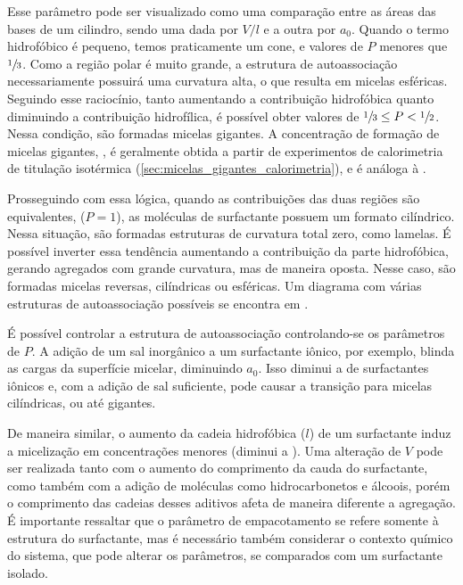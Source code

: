	Esse parâmetro pode ser visualizado como uma comparação entre as áreas das bases de um cilindro, sendo uma dada por \({V}/{l}\) e a outra por \(a_0\). Quando o termo hidrofóbico é pequeno, temos praticamente um cone, e valores de \(P\) menores que \(\sfrac{1}{3}\). Como a região polar é muito grande, a estrutura de autoassociação necessariamente possuirá uma curvatura alta, o que resulta em micelas esféricas. Seguindo esse raciocínio, tanto aumentando a contribuição hidrofóbica quanto diminuindo a contribuição hidrofílica, é possível obter valores de \(\sfrac{1}{3} \leq P < \sfrac{1}{2}\). Nessa condição, são formadas micelas gigantes. A concentração de formação de micelas gigantes, \cwlm, é geralmente obtida a partir de experimentos de calorimetria de titulação isotérmica (\autoref{sec:micelas_gigantes_calorimetria}), e é análoga à \cmc.
	
	Prosseguindo com essa lógica, quando as contribuições das duas regiões são equivalentes, (\(P = 1\)), as moléculas de surfactante possuem um formato cilíndrico. Nessa situação, são formadas estruturas de curvatura total zero, como lamelas.\cite{Zou2007} É possível inverter essa tendência aumentando a contribuição da parte hidrofóbica, gerando agregados com grande curvatura, mas de maneira oposta. Nesse caso, são formadas micelas reversas, cilíndricas\cite{Tung2006} ou esféricas\cite{Mackeben2001a}.  Um diagrama com várias estruturas de autoassociação possíveis se encontra em \citeauthor{Lindman_livro}.

	É possível controlar a estrutura de autoassociação controlando-se os parâmetros de \(P\). A adição de um sal inorgânico a um surfactante iônico, por exemplo, blinda as cargas da superfície micelar, diminuindo \(a_0\). Isso diminui a \cmc{} de surfactantes iônicos\cite{Sarac2009} e, com a adição de sal suficiente, pode causar a transição para micelas cilíndricas,\cite{Garamus2003a} ou até gigantes.\cite{Helgeson2010d} 
	
	De maneira similar, o aumento da cadeia hidrofóbica (\(l\)) de um surfactante induz a micelização em concentrações menores (diminui a \cmc).\cite{Bai2008, Sarac2017a} Uma alteração de \(V\) pode ser realizada tanto com o aumento do comprimento da cauda do surfactante, como também com a adição de moléculas como hidrocarbonetos e álcoois, porém o comprimento das cadeias desses aditivos afeta de maneira diferente a agregação.\cite{Bayer1986, Bielawska2013a, Kamada2014a} É importante ressaltar que o parâmetro de empacotamento se refere somente à estrutura do surfactante, mas é necessário também considerar o contexto químico do sistema, que pode alterar os parâmetros, se comparados com um surfactante isolado. 
	
